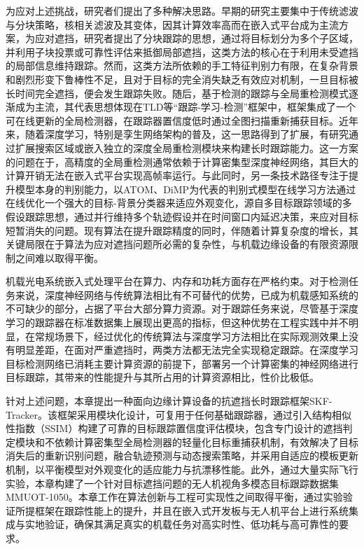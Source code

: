 为应对上述挑战，研究者们提出了多种解决思路\cite{GXGD202304001}。早期的研究主要集中于传统滤波与分块策略，核相关滤波及其变体，因其计算效率高而在嵌入式平台成为主流方案，为应对遮挡，研究者提出了分块跟踪的思想，通过将目标划分为多个子区域，并利用子块投票或可靠性评估来抵御局部遮挡，这类方法的核心在于利用未受遮挡的局部信息维持跟踪。然而，这类方法所依赖的手工特征判别力有限，在复杂背景和剧烈形变下鲁棒性不足，且对于目标的完全消失缺乏有效应对机制，一旦目标被长时间完全遮挡，便会发生跟踪失败。随后，基于检测的跟踪与全局重检测模式逐渐成为主流，其代表思想体现在TLD等“跟踪-学习-检测”框架中，框架集成了一个可在线更新的全局检测器，在跟踪器置信度低时通过全图扫描重新捕获目标。近年来，随着深度学习，特别是孪生网络架构的普及，这一思路得到了扩展，有研究通过扩展搜索区域或嵌入独立的深度全局重检测模块来构建长时跟踪能力。这一方案的问题在于，高精度的全局重检测通常依赖于计算密集型深度神经网络，其巨大的计算开销无法在嵌入式平台实现高帧率运行。与此同时，另一条技术路径专注于提升模型本身的判别能力，以ATOM、DiMP为代表的判别式模型在线学习方法通过在线优化一个强大的目标-背景分类器来适应外观变化，源自多目标跟踪领域的多假设跟踪思想，通过并行维持多个轨迹假设并在时间窗口内延迟决策，来应对目标短暂消失的问题。现有算法在提升跟踪精度的同时，伴随着计算复杂度的增长，其关键局限在于算法为应对遮挡问题所必需的复杂性，与机载边缘设备的有限资源限制之间难以取得平衡。

机载光电系统嵌入式处理平台在算力、内存和功耗方面存在严格约束。对于检测任务来说，深度神经网络与传统算法相比有不可替代的优势，已成为机载感知系统的不可缺少的部分，占据了平台大部分算力资源。对于跟踪任务来说，尽管基于深度学习的跟踪器在标准数据集上展现出更高的指标，但这种优势在工程实践中并不明显，在常规场景下，经过优化的传统算法与深度学习方法相比在实际观测效果上没有明显差距，在面对严重遮挡时，两类方法都无法完全实现稳定跟踪。在深度学习目标检测网络已消耗主要计算资源的前提下，部署另一个计算密集的神经网络进行目标跟踪，其带来的性能提升与其所占用的计算资源相比，性价比极低。

针对上述问题，本章提出一种面向边缘计算设备的抗遮挡长时跟踪框架SKF-Tracker。该框架采用模块化设计，可复用于任何基础跟踪器，通过引入结构相似性指数（SSIM）构建了可靠的目标跟踪置信度评估模块，包含专门设计的遮挡判定模块和不依赖计算密集型全局检测器的轻量化目标重捕获机制，有效解决了目标消失后的重新识别问题，融合轨迹预测与动态搜索策略，并采用自适应的模板更新机制，以平衡模型对外观变化的适应能力与抗漂移性能。此外，通过大量实际飞行实验，本章构建了一个针对目标遮挡问题的无人机视角多模态目标跟踪数据集MMUOT-1050。本章工作在算法创新与工程可实现性之间取得平衡，通过实验验证所提框架在跟踪性能上的提升，并且在嵌入式开发板与无人机平台上进行系统集成与实地验证，确保其满足真实的机载任务对高实时性、低功耗与高可靠性的要求。

